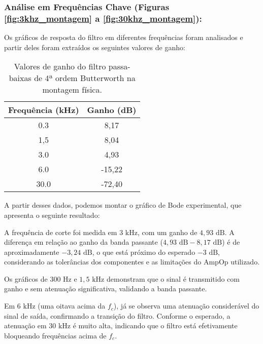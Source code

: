 \subsubsection{Análise em Frequências Chave (Figuras \ref{fig:3khz_montagem} a \ref{fig:30khz_montagem}):}
Os gráficos de resposta do filtro em diferentes frequências foram analisados e partir deles foram extraídos os seguintes valores de ganho:

\begin{table}[H]
\centering
\begin{tabular}{|c|c|}
\hline
\textbf{Frequência (kHz)} & \textbf{Ganho (dB)} \\
\hline
0.3 & 8,17 \\ \hline
1,5 & 8,04 \\ \hline
3.0 & 4,93 \\ \hline
6.0 & -15,22 \\ \hline
30.0 & -72,40 \\ \hline
\end{tabular}
\caption{Valores de ganho do filtro passa-baixas de 4ª ordem Butterworth na montagem física.}
\label{tab:ganho_montagem}
\end{table}

A partir desses dados, podemos montar o gráfico de Bode experimental, que apresenta o seguinte resultado:


A frequência de corte foi medida em $3 \text{ kHz}$, com um ganho de $4,93 \text{ dB}$. A diferença em relação ao ganho da banda passante ($4,93 \text{ dB} - 8,17 \text{ dB}$) é de aproximadamente $-3,24 \text{ dB}$, o que está próximo do esperado $-3 \text{ dB}$, considerando as tolerâncias dos componentes e as limitações do AmpOp utilizado.

Os gráficos de $300 \text{ Hz}$ e $1,5 \text{ kHz}$ demonstram que o sinal é transmitido com ganho e sem atenuação significativa, validando a banda passante.

Em $6 \text{ kHz}$ (uma oitava acima da $f_c$), já se observa uma atenuação considerável do sinal de saída, confirmando a transição do filtro. Conforme o esperado, a atenuação em $30 \text{ kHz}$ é muito alta, indicando que o filtro está efetivamente bloqueando frequências acima de $f_c$.

